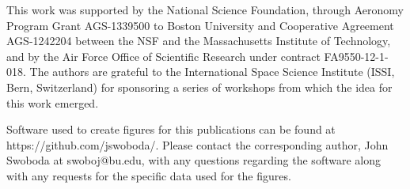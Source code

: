 \documentclass[draft,ras]{agutex}
\begin{document}
\begin{article}
\begin{acknowledgments}
This work was supported by the National Science Foundation, through Aeronomy Program Grant AGS-1339500 to Boston University and Cooperative Agreement AGS-1242204 between the NSF and the Massachusetts Institute of Technology, and by the Air Force Office of Scientific Research under contract FA9550-12-1-018.   The authors are grateful to the International Space Science Institute (ISSI, Bern, Switzerland) for sponsoring a series of workshops from which the idea for this work emerged. 

Software used to create figures for this publications can be found at https://github.com/jswoboda/. Please contact the corresponding author, John Swoboda at swoboj@bu.edu, with any questions regarding the software along with any requests for the specific data used for the figures. \end{acknowledgments}




\end{article}
\end{document}
